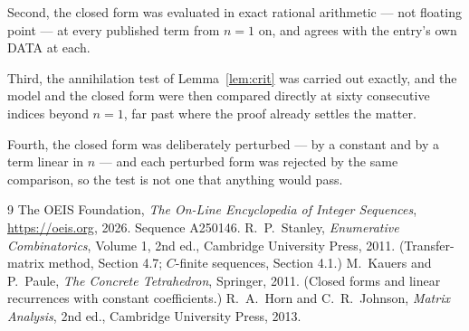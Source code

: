\documentclass[11pt,a4paper]{article}
\theoremstyle{plain}
\theoremstyle{definition}
\begin{document}
Second, the closed form was evaluated in exact rational arithmetic --- not floating point ---
at every published term from $n=1$ on, and agrees with the entry's own DATA at each.

Third, the annihilation test of Lemma~\ref{lem:crit} was carried out exactly, and the model
and the closed form were then compared directly at sixty consecutive indices beyond
$n=1$, far past where the proof already settles the matter.

Fourth, the closed form was deliberately perturbed --- by a constant and by a term linear in
$n$ --- and each perturbed form was rejected by the same comparison, so the test is not one
that anything would pass.

\begin{thebibliography}{9}
 The OEIS Foundation, \emph{The On-Line Encyclopedia of Integer
Sequences}, \url{https://oeis.org}, 2026. Sequence A250146.
 R.~P.~Stanley, \emph{Enumerative Combinatorics}, Volume 1, 2nd ed.,
Cambridge University Press, 2011. (Transfer-matrix method, Section 4.7; $C$-finite sequences,
Section 4.1.)
 M.~Kauers and P.~Paule, \emph{The Concrete Tetrahedron}, Springer, 2011.
(Closed forms and linear recurrences with constant coefficients.)
 R.~A.~Horn and C.~R.~Johnson, \emph{Matrix Analysis}, 2nd ed., Cambridge
University Press, 2013.
\end{thebibliography}
\end{document}
